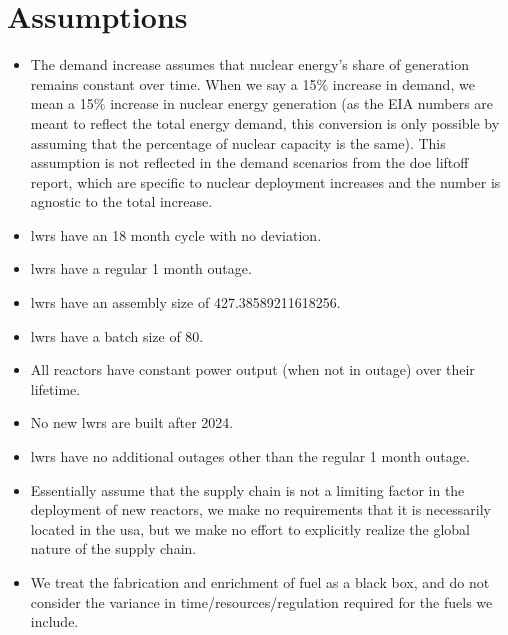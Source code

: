 \section{Assumptions}
\label{sec:assumptions}

\begin{itemize}
    \item The demand increase assumes that nuclear energy's share of generation remains constant over time. When we say a 15$\%$ increase in demand, we mean a 15$\%$ increase in nuclear energy generation (as the EIA numbers are meant to reflect the total energy demand, this conversion is only possible by assuming that the percentage of nuclear capacity is the same). This assumption is not reflected in the demand scenarios from the \gls{doe} liftoff report, which are specific to nuclear deployment increases and the number is agnostic to the total increase.
    \item \gls{lwr}s have an 18 month cycle with no deviation.
    \item \gls{lwr}s have a regular 1 month outage.
    \item \gls{lwr}s have an assembly size of 427.38589211618256.
    \item \gls{lwr}s have a batch size of 80.
    \item All reactors have constant power output (when not in outage) over their lifetime.
    \item No new \gls{lwr}s are built after 2024. %
    \item \gls{lwr}s have no additional outages other than the regular 1 month outage.
    \item Essentially assume that the supply chain is not a limiting factor in the deployment of new reactors, we make no requirements that it is necessarily located in the \gls{usa}, but we make no effort to explicitly realize the global nature of the supply chain.
    \item We treat the fabrication and enrichment of fuel as a black box, and do not consider the variance in time/resources/regulation required for the fuels we include.
\end{itemize}